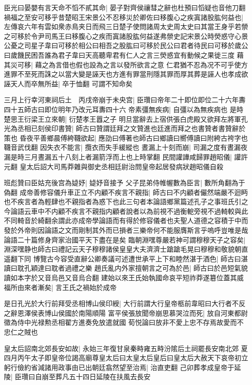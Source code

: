 臣光曰晏嬰有言天命不慆不貳其命|{
	晏子對齊侯禳彗之辭也杜預曰慆疑也音他刀翻}
禍福之至安可移乎昔楚昭王宋景公不忍移災於卿佐曰移腹心之疾寘諸股肱何益也|{
	左傳哀六年有雲如衆赤鳥夹日而飛三日楚子使問諸周太史周太史曰其當王身乎若禜之可移於令尹司馬王曰移腹心之疾而寘諸股肱何益遂弗禜史記宋景公時熒惑守心景公憂之司星子韋曰可移於相公曰相吾之股肱曰可移於民公曰君者待民曰可移於歲公曰歲饑民困吾誰為君子韋曰天高聽卑君有仁人之言三熒惑宜有動候之果徙三度}
藉其災可移|{
	藉之為言借也假也設為之言以發所欲言之意}
仁君猶不忍為况不可乎使方進罪不至死而誅之以當大變是誣天也方進有罪當刑隱其罪而厚其葬是誣人也孝成欲誣天人而卒無所益|{
	卒于恤翻}
可謂不知命矣

三月上行幸河東祠后土　丙戌帝崩于未央宫|{
	臣瓚曰帝年二十即位即位二十六年夀四十五師古曰即位明年乃改元耳夀四十六}
帝素彊無疾病|{
	自彊以為無疾病也}
是時楚思王衍梁王立來朝|{
	衍楚孝王囂之子}
明旦當辭去上宿供張白虎殿又欲拜左將軍孔光為丞相已刻侯印書贊|{
	師古曰贊謂廷拜之文贊進也廷進而拜之也書贊者書贊辭於策也}
昏夜平善鄉晨傅絝韈欲起|{
	應劭曰傅著也師古曰鄉讀曰嚮傅讀曰附絝古袴字也韈音武伐翻}
因失衣不能言|{
	攬衣而失手緩縱也}
晝漏上十刻而崩|{
	司漏之度有晝漏夜漏是時三月晝漏五十八刻上者漏箭浮而上也上時掌翻}
民間讙譁咸歸罪趙昭儀|{
	讙許元翻}
皇太后詔大司馬莽雜與御史丞相廷尉治問皇帝起居發病狀趙昭儀自殺

班彪贊曰臣姑充後宫為媫妤|{
	媫妤音接予}
父子昆弟侍帷幄數為臣言|{
	數所角翻為于偽翻}
成帝善修容儀升車正立不内顧不疾言不親指|{
	師古曰不内顧者儼然端嚴不迴眄也不疾言者為輕肆也不親指者為惑下也此三句者本論語鄉黨篇述孔子之事班氏引之今論語云車中不内顧不疾言不親指内顧者說者以為前視不過衡軶旁視不過輢較與此不同輢音於綺翻余謂此亦成帝學論語而有得於修容儀者也夫聖人道德之容積于中而發於外帝則因論語之文而剛制其外而已損者三樂帝何不能服膺斯言乎嗚呼豈唯是哉論語二十篇修身齊家治國平天下盡在是矣}
臨朝淵嘿尊嚴若神可謂穆穆天子之容矣|{
	淵深嘿静也師古曰禮記云天子穆穆諸侯皇皇大夫濟濟士蹌蹌毛晃曰穆穆和敬貌朝直遥翻下同}
博覽古今容受直辭公卿奏議可述遭世承平上下和睦然湛于酒色|{
	師古曰湛讀曰耽孔穎達曰耽者過禮之樂}
趙氏亂内外家擅朝言之可為於邑|{
	師古曰於邑短氣貌讀如本字於又音烏邑又音烏合翻}
建始以來王氏始執國命哀平短祚莽遂簒位蓋其威福所由來者漸矣|{
	言王氏之禍始於成帝}


是日孔光於大行前拜受丞相博山侯印綬|{
	大行前謂大行皇帝柩前韋昭曰大行者不反之辭恩澤侯表博山侯國於南陽順陽}
富平侯張放聞帝崩思慕哭泣而死|{
	放自河東都尉徵為侍中光禄勲丞相翟方進奏免放遣就國}
荀悦論曰放非不愛上忠不存焉故愛而不忠仁之賊也

皇太后詔南北郊長安如故|{
	永始三年復甘泉秦畤雍五畤汾隂后土祠罷長安南北郊}
夏四月丙午太子即皇帝位謁高廟尊皇太后曰太皇太后皇后曰皇太后大赦天下哀帝初立躬行儉約省減諸用政事由已出朝廷翕然望至治焉|{
	治直吏翻}
己卯葬孝成皇帝于延陵|{
	臣瓚曰自崩至葬凡五十四日延陵在扶風去長安}


